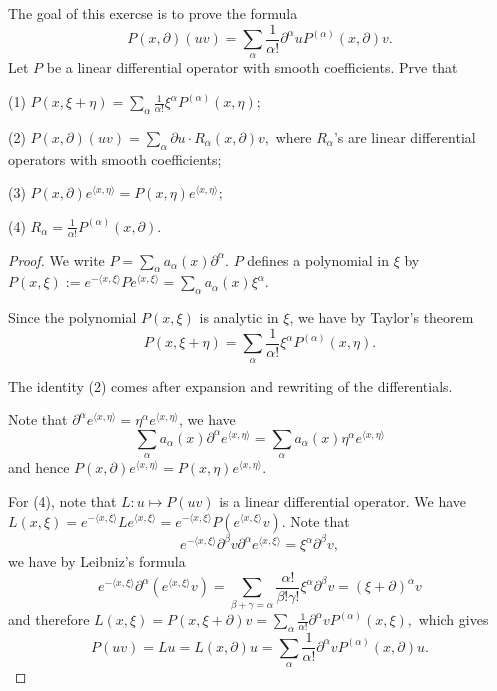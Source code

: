 \documentclass[
    ]{article}
\begin{document}
    \begin{exercise}
        The goal of this exercse is to prove the formula
        \[P(x,\partial)(uv)=\sum_\alpha\frac1{\alpha!}\partial^\alpha uP^{(\alpha)}(x,\partial)v.\]
        Let $P$ be a linear differential operator with smooth coefficients. Prve that

        (1) $P(x,\xi+\eta)=\sum_\alpha \frac1{\alpha!}\xi^\alpha P^{(\alpha)}(x,\eta);$

        (2) $P(x,\partial)(uv)=\sum_\alpha\partial u\cdot R_\alpha(x,\partial)v,$
        where $R_\alpha$'s are linear differential operators with smooth coefficients;

        (3) $P(x,\partial)e^{\langle x,\eta\rangle}=P(x,\eta)e^{\langle x,\eta\rangle};$

        (4) $R_\alpha=\frac1{\alpha!}P^{(\alpha)}(x,\partial).$
    \end{exercise}
    \begin{proof}
        We write $P=\sum_\alpha a_\alpha(x)\partial^\alpha$. 
        $P$ defines a polynomial in $\xi$ by $P(x,\xi):=e^{-\langle x,\xi\rangle}Pe^{\langle x,\xi\rangle}=\sum_\alpha a_\alpha(x)\xi^\alpha$.
        
        Since the polynomial $P(x,\xi)$ is analytic in $\xi$, we have by Taylor's theorem 
        \[P(x,\xi+\eta)=\sum_\alpha \frac1{\alpha!}\xi^\alpha P^{(\alpha)}(x,\eta).\]

        The identity (2) comes after expansion and rewriting of the differentials.

        Note that $\partial^\alpha e^{\langle x,\eta\rangle}=\eta^\alpha e^{\langle x,\eta\rangle}$, we have
        \[\sum_\alpha a_\alpha(x)\partial^\alpha e^{\langle x,\eta\rangle}=\sum_\alpha a_\alpha(x)\eta^\alpha e^{\langle x,\eta\rangle}\]
        and hence $P(x,\partial)e^{\langle x,\eta\rangle}=P(x,\eta)e^{\langle x,\eta\rangle}$.

        For (4), note that $L:u\mapsto P(uv)$ is a linear differential operator. We have $L(x,\xi)=e^{-\langle x,\xi\rangle}Le^{\langle x,\xi\rangle}=e^{-\langle x,\xi\rangle}P(e^{\langle x,\xi\rangle}v)$. 
        Note that 
        \[e^{-\langle x,\xi\rangle}\partial^\beta v\partial^\alpha e^{\langle x,\xi\rangle}=\xi^\alpha\partial^\beta v,\]
        we have by Leibniz's formula
        \[e^{-\langle x,\xi\rangle}\partial^\alpha(e^{\langle x,\xi\rangle}v)=\sum_{\beta+\gamma=\alpha}\frac{\alpha!}{\beta!\gamma!}\xi^\alpha\partial^\beta v=(\xi+\partial)^\alpha v\]
        and therefore $L(x,\xi)=P(x,\xi+\partial)v=\sum_\alpha \frac1{\alpha!}\partial^\alpha vP^{(\alpha)}(x,\xi),$ which gives
        \[P(uv)=Lu=L(x,\partial)u=\sum_\alpha \frac1{\alpha!}\partial^\alpha vP^{(\alpha)}(x,\partial)u.\]
    \end{proof}
     
\end{document}
